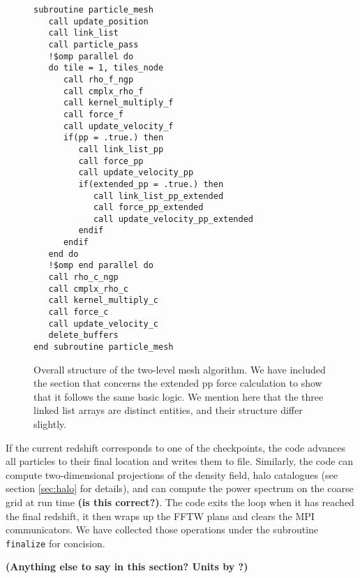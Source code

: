 \begin{figure}
\begin{verbatim}
subroutine particle_mesh
   call update_position
   call link_list
   call particle_pass
   !$omp parallel do
   do tile = 1, tiles_node
      call rho_f_ngp
      call cmplx_rho_f
      call kernel_multiply_f
      call force_f
      call update_velocity_f
      if(pp = .true.) then       
         call link_list_pp
         call force_pp
         call update_velocity_pp
         if(extended_pp = .true.) then
            call link_list_pp_extended
            call force_pp_extended
            call update_velocity_pp_extended       
         endif
      endif
   end do
   !$omp end parallel do
   call rho_c_ngp
   call cmplx_rho_c
   call kernel_multiply_c
   call force_c
   call update_velocity_c      
   delete_buffers
end subroutine particle_mesh
\end{verbatim}
\caption{Overall structure of the two-level mesh algorithm. We have included the section that concerns the extended pp force calculation to show that it follows the same basic logic. We mention here that the three linked list arrays are distinct entities, and their structure differ slightly.  }
\label{fig:particle_mesh}
\end{figure}


If the current redshift corresponds to one of the checkpoints, the code advances all particles to their final location
and writes them to file. Similarly, the code can compute two-dimensional projections of the density field, halo catalogues (see section \ref{sec:halo} for details), and can compute the power spectrum on the coarse grid at run time {\bf (is this correct?)}. 
The code exits the loop when it has reached the final redshift, it then wraps up the {\small FFTW} plans 
and clears the {\small MPI} communicators. We have collected those operations under the subroutine {\tt finalize} for concision.


{\bf (Anything else to say in this section? Units by \citep{2004NewA....9..443T}?)}
